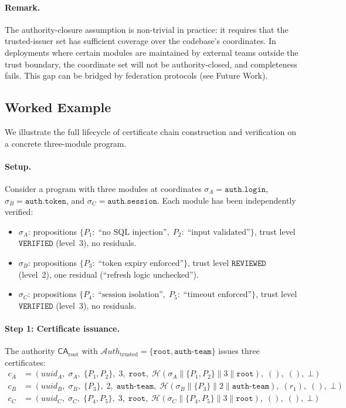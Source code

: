 \documentclass[11pt]{article}
\newcommand{\CA}{\mathsf{CA}}                  %
\newcommand{\Sigalg}{\mathcal{H}}              %
\newcommand{\AuthSet}{\mathcal{A}\!\mathit{uth}} %
\begin{document}
\paragraph{Remark.}
The authority-closure assumption is non-trivial in practice:
it requires that the trusted-issuer set has sufficient coverage over
the codebase's coordinates.  In deployments where certain modules
are maintained by external teams outside the trust boundary, the
coordinate set will not be authority-closed, and completeness fails.
This gap can be bridged by federation protocols (see Future Work).

\subsection{Worked Example}\label{sec:worked-example}

We illustrate the full lifecycle of certificate chain construction
and verification on a concrete three-module program.

\paragraph{Setup.}
Consider a program with three modules at coordinates
$\sigma_A = \texttt{auth.login}$,
$\sigma_B = \texttt{auth.token}$, and
$\sigma_C = \texttt{auth.session}$.
Each module has been independently verified:
\begin{itemize}
  \item $\sigma_A$: propositions $\{P_1{:}\;\text{``no SQL injection''},\; P_2{:}\;\text{``input validated''}\}$,
        trust level $\texttt{VERIFIED}$ (level~3), no residuals.
  \item $\sigma_B$: propositions $\{P_3{:}\;\text{``token expiry enforced''}\}$,
        trust level $\texttt{REVIEWED}$ (level~2), one residual (``refresh logic unchecked'').
  \item $\sigma_C$: propositions $\{P_4{:}\;\text{``session isolation''},\; P_5{:}\;\text{``timeout enforced''}\}$,
        trust level $\texttt{VERIFIED}$ (level~3), no residuals.
\end{itemize}

\paragraph{Step 1: Certificate issuance.}
The authority $\CA_{\mathrm{root}}$ with
$\AuthSet_{\mathrm{trusted}} = \{\texttt{root}, \texttt{auth-team}\}$
issues three certificates:
\begin{align*}
c_A &= (\mathit{uuid}_A,\; \sigma_A,\; \{P_1, P_2\},\; 3,\; \texttt{root},\;
         \Sigalg(\sigma_A \| \{P_1,P_2\} \| 3 \| \texttt{root}),\; (),\; (),\; \bot) \\
c_B &= (\mathit{uuid}_B,\; \sigma_B,\; \{P_3\},\; 2,\; \texttt{auth-team},\;
         \Sigalg(\sigma_B \| \{P_3\} \| 2 \| \texttt{auth-team}),\; (r_1),\; (),\; \bot) \\
c_C &= (\mathit{uuid}_C,\; \sigma_C,\; \{P_4, P_5\},\; 3,\; \texttt{root},\;
         \Sigalg(\sigma_C \| \{P_4,P_5\} \| 3 \| \texttt{root}),\; (),\; (),\; \bot)
\end{align*}
\end{document}
